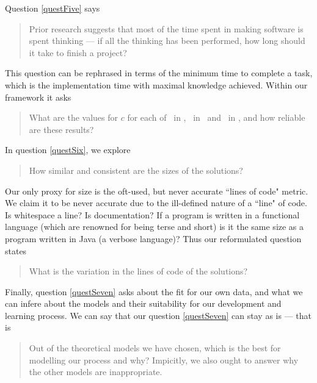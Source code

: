 Question \ref{questFive} says
\begin{quote}
  Prior research suggests that most of the time spent in making software is spent
  thinking --- if all the thinking has been performed, how long should it take to
  finish a project?
\end{quote}

This question can be rephrased in terms of the minimum time to complete a task,
     which is the implementation time with maximal knowledge achieved.
Within our framework it asks
\begin{quote}
  What are the values for $c$ for each of \PO\ in \LA, \PO\ in \LB\ and \PT\ in
  \LA, and how reliable are these results?
\end{quote} \label{qq5}

In question \ref{questSix}, we explore
\begin{quote}
  How similar and consistent are the sizes of the solutions?
\end{quote}

Our only proxy for size is the oft-used, but never accurate ``lines of code"
metric.
We claim it to be never accurate due to the ill-defined nature of a ``line" of
code.
Is whitespace a line?
Is documentation?
If a program is written in a functional language (which are renowned for being
terse and short) is it the same size as a program written in Java (a verbose
language)?
Thus our reformulated question states
\begin{quote}
  What is the variation in the lines of code of the solutions?
\end{quote} \label{qq6}

Finally, question \ref{questSeven} asks about the fit for our own data, and what we can
infere about the models and their suitability for our development and learning
process.
We can say that our question \ref{questSeven} can stay as is --- that is
\begin{quote}
  Out of the theoretical models we have chosen, which is the best for modelling
  our process and why?
  Impicitly, we also ought to answer why the other models are inappropriate.
\end{quote} \label{qq7}
